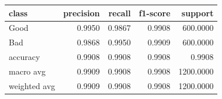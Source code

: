 \begin{tabular}{lrrrr}
\toprule
class & precision & recall & f1-score & support \\
\midrule
Good & 0.9950 & 0.9867 & 0.9908 & 600.0000 \\
Bad & 0.9868 & 0.9950 & 0.9909 & 600.0000 \\
accuracy & 0.9908 & 0.9908 & 0.9908 & 0.9908 \\
macro avg & 0.9909 & 0.9908 & 0.9908 & 1200.0000 \\
weighted avg & 0.9909 & 0.9908 & 0.9908 & 1200.0000 \\
\bottomrule
\end{tabular}

